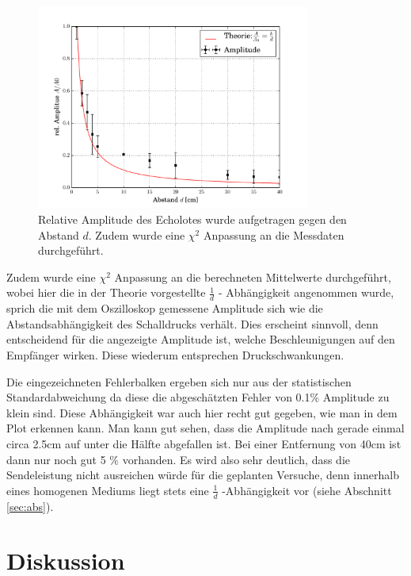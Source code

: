 \documentclass[12pt,a4paper,titlepage,headinclude,bibtotoc]{scrartcl}
\numberwithin{equation}{subsection}
\begin{document}
\begin{figure}[h]
	\centering
	\includegraphics[width=0.8\textwidth]{schall.pdf}
	\caption{Relative Amplitude des Echolotes wurde aufgetragen gegen den Abstand $d$. Zudem wurde eine $\chi^2$ Anpassung an die Messdaten durchgeführt.}
	\label{fig:schall}
\end{figure}

Zudem wurde eine $\chi^2$ Anpassung an die berechneten Mittelwerte durchgeführt, wobei hier die in der Theorie vorgestellte $\frac{1}{d}$ - Abhängigkeit angenommen wurde, sprich die mit dem Oszilloskop gemessene Amplitude sich wie die Abstandsabhängigkeit des Schalldrucks verhält.
Dies erscheint sinnvoll, denn entscheidend für die angezeigte Amplitude ist, welche Beschleunigungen auf den Empfänger wirken.
Diese wiederum entsprechen Druckschwankungen.

Die eingezeichneten Fehlerbalken ergeben sich nur aus der statistischen Standardabweichung da diese die abgeschätzten Fehler von 0.1\% Amplitude zu klein sind. Diese Abhängigkeit war auch hier recht gut gegeben, wie man in dem Plot erkennen kann. 
Man kann gut sehen, dass die Amplitude nach gerade einmal circa 2.5\si{\centi\meter} auf unter die Hälfte abgefallen ist. Bei einer Entfernung von 40\si{\centi\meter} ist dann nur noch gut 5 $\%$ vorhanden. Es wird also sehr deutlich, dass die Sendeleistung nicht ausreichen würde für die geplanten Versuche, denn innerhalb eines homogenen Mediums liegt stets eine $\frac{1}{d}$ -Abhängigkeit vor (siehe Abschnitt \ref{sec:abs}). 



\section{Diskussion}
\label{sec:diskussion}
\end{document}
